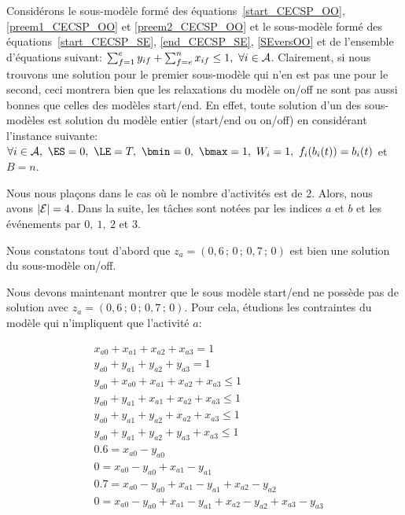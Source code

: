 Considérons le sous-modèle formé des
équations~\eqref{start_CECSP_OO}, \eqref{preem1_CECSP_OO} et
\eqref{preem2_CECSP_OO} et le sous-modèle formé des
équations~\eqref{start_CECSP_SE}, \eqref{end_CECSP_SE},
\eqref{SEversOO} et de l'ensemble d'équations suivant: $\sum_{f=1}^e
y_{if} +\sum_{f=e}^n x_{if}\le 1,\ \forall i \in {\cal A}$. Clairement, si
nous trouvons une solution pour le premier sous-modèle qui n'en est
pas une pour le second, ceci montrera bien que les relaxations du modèle
on/off ne sont pas aussi bonnes que celles des modèles start/end. En
effet, toute solution d'un des sous-modèles est solution du modèle
entier (start/end ou on/off) en considérant l'instance suivante:
$\forall i \in \A,\ \ES=0,\ \LE=T,\ \bmin=0,\ \bmax=1,\ W_i=1,\
f_i(b_i(t))=b_i(t)$ et $B=n$. 

Nous nous plaçons dans le cas où le nombre d'activités est de 2. Alors,
nous avons $|{\cal E}|=4$.  Dans la suite, les tâches sont notées par les
indices $a$ et $b$ et les événements par $0,\ 1,\ 2$ et $3$.

Nous constatons tout d'abord que $z_a=(0,6\,;\,0\,;\,0,7\,;\,0)$ est bien une
solution du sous-modèle on/off. 

Nous devons maintenant montrer que le sous modèle start/end ne possède
pas de solution avec $z_a=(0,6\,;\,0\,;\,0,7\,;\,0)$. Pour cela, étudions les contraintes du
modèle qui n'impliquent que l'activité $a$:

\begin{align} &x_{a0}+x_{a1}+x_{a2}+x_{a3}= 1 \label{c9}\\
              &y_{a0}+y_{a1}+y_{a2}+y_{a3}= 1 \label{c10}\\
              &y_{a0}+x_{a0}+x_{a1}+x_{a2}+x_{a3}\le1 \label{c11}\\
              &y_{a0}+y_{a1}+x_{a1}+x_{a2}+x_{a3}\le1 \label{c12}\\
              &y_{a0}+y_{a1}+y_{a2}+x_{a2}+x_{a3}\le1 \label{c13}\\
              &y_{a0}+y_{a1}+y_{a2}+y_{a3}+x_{a3}\le1 \label{c14}\\
              &0.6=x_{a0}-y_{a0}\label{c17}\\
              &0=x_{a0}-y_{a0}+x_{a1}-y_{a1}\label{c18}\\
              &0.7=x_{a0}-y_{a0}+x_{a1}-y_{a1}+x_{a2}-y_{a2}\label{c19}\\
              &0=x_{a0}-y_{a0}+x_{a1}-y_{a1}+x_{a2}-y_{a2}+x_{a3}-y_{a3}\label{c20}
\end{align}


